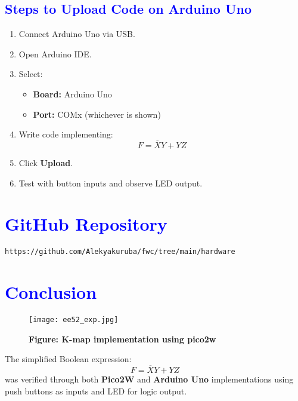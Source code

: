 \documentclass[twocolumn]{article}
\begin{document}
\subsection*{\textcolor{blue}{Steps to Upload Code on Arduino Uno}}

\begin{enumerate}
    \item Connect Arduino Uno via USB.
    \item Open Arduino IDE.
    \item Select:
    \begin{itemize}
        \item \textbf{Board:} Arduino Uno
        \item \textbf{Port:} COMx (whichever is shown)
    \end{itemize}
    \item Write code implementing:
    \[
    F = \overline{X}Y + YZ
    \]
    \item Click \textbf{Upload}.
    \item Test with button inputs and observe LED output.
\end{enumerate}
\section*{\textcolor{blue}{GitHub Repository}}
\texttt{https://github.com/Alekyakuruba/fwc/tree/main/hardware}
\section*{\textcolor{blue}{Conclusion}}
\begin{figure}[h]
    \centering
    \texttt{[image: ee52\_exp.jpg]}
    \caption*{\textbf{Figure: K-map implementation using pico2w}}
\end{figure}
The simplified Boolean expression:
\[
F = \overline{X}Y + YZ
\]
was verified through both \textbf{Pico2W} and \textbf{Arduino Uno} implementations using push buttons as inputs and LED for logic output.
\end{document}
